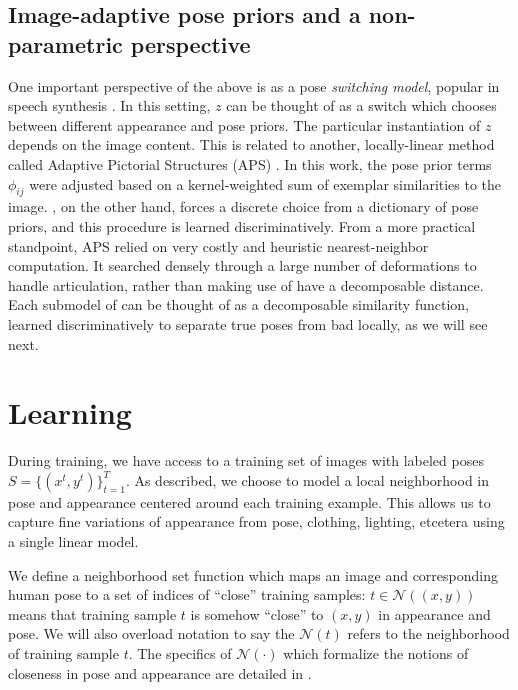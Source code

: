 \subsection{Image-adaptive pose priors and a non-parametric perspective}
One important perspective of the above is as a pose {\em switching model}, 
popular in speech synthesis \citep{rosti2003switching}.  In this setting, $z$ 
can be thought of as a switch which chooses between different appearance and 
pose priors.  The particular instantiation of $z$ depends on the image content.  
This is related to another, locally-linear method called Adaptive Pictorial 
Structures (APS) \citet{sapp2010}.  In this work, the pose prior terms 
$\phi_{ij}$ were adjusted based on a kernel-weighted sum of exemplar 
similarities to the image.  \LLPS, on the other hand, forces a discrete choice 
from a dictionary of pose priors, and this procedure is learned 
discriminatively.  From a more practical standpoint, APS relied on very costly 
and heuristic nearest-neighbor computation.  It searched densely through a 
large number of deformations to handle articulation, rather than making use of 
have a decomposable distance.  Each submodel of \LLPS can be thought of as a 
decomposable similarity function, learned discriminatively to separate true 
poses from bad locally, as we will see next.

\section{Learning}\label{sec:llps-learning}

During training, we have access to a training set of images with labeled poses 
$S = \{(x^{t},y^{t})\}_{t=1}^T$.  As described, we choose to model a local 
neighborhood in pose and appearance centered around each training example.  
This allows us to capture fine variations of appearance from pose, clothing, 
lighting, etcetera using a single linear model.

We define a neighborhood set function which maps an image and corresponding 
human pose to a set of indices of ``close'' training samples: $t \in 
\mathcal{N}((x,y))$ means that training sample $t$ is somehow ``close'' to 
$(x,y)$ in appearance and pose.  We will also overload notation to say the 
$\mathcal{N}(t)$ refers to the neighborhood of training sample $t$.  The 
specifics of $\mathcal{N}(\cdot)$ which formalize the notions of closeness in 
pose and appearance are detailed in .

